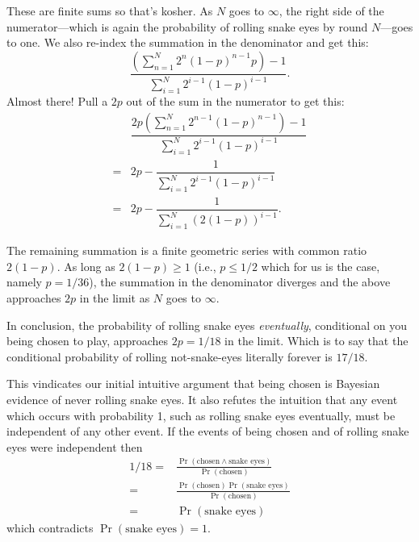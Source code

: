 \documentclass[article,twocolumn]{memoir}
\begin{document}
These are finite sums so that's kosher.
As $N$ goes to $\infty$, the right side of the numerator---which is again the probability of rolling snake eyes by round $N$---goes to one.
We also re-index the summation in the denominator and get this:
$$
\dfrac{
\left(\sum\limits_{n=1}^{N}2^n(1-p)^{n-1}p\right) - 1
}
{\sum\limits_{i=1}^{N}2^{i-1}(1-p)^{i-1}}.
$$
Almost there!
Pull a $2p$ out of the sum in the numerator to get this:
\begin{equation*}
\begin{split}
& \dfrac{
2p\left(\sum\limits_{n=1}^{N}2^{n-1}(1-p)^{n-1}\right) - 1
}
{\sum\limits_{i=1}^{N}2^{i-1}(1-p)^{i-1}} \\
= & 2p - \dfrac{1} 
{\sum\limits_{i=1}^{N}2^{i-1}(1-p)^{i-1}} \\
= & 2p - \dfrac{1} 
{\sum\limits_{i=1}^{N}\left(2(1-p)\right)^{i-1}}.
\end{split}
\end{equation*}

The remaining summation is a finite geometric series with common ratio $2(1-p)$.
As long as $2(1-p) \geq 1$ (i.e., $p\leq 1/2$ which for us is the case, namely $p=1/36$), the summation in the denominator diverges and the above approaches $2p$ in the limit as $N$ goes to $\infty$.

In conclusion, the probability of rolling snake eyes \emph{eventually}, conditional on you being chosen to play, approaches $2p=1/18$ in the limit.
Which is to say that the conditional probability of rolling not-snake-eyes literally forever is $17/18$.

This vindicates our initial intuitive argument that being chosen is Bayesian evidence of never rolling snake eyes.
It also refutes the intuition that any event which occurs with probability 1, such as rolling snake eyes eventually, must be independent of any other event.
If the events of being chosen and of rolling snake eyes were independent then   
\begin{align*}
   1/18 = & \frac{\Pr(\text{chosen} \land \text{snake eyes})}{\Pr(\text{chosen})}\\
     = & \frac{\Pr(\text{chosen})\Pr(\text{snake eyes})}{\Pr(\text{chosen})}\\
     = & \Pr(\text{snake eyes}) 
\end{align*}
which contradicts $\Pr(\text{snake eyes}) = 1$.
\end{document}
